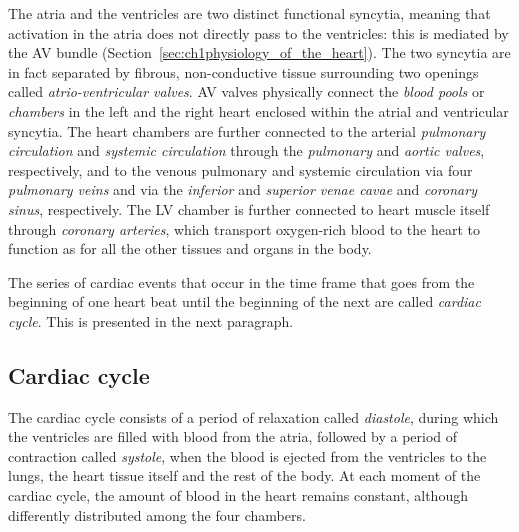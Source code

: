 \vspace{0.2cm}
The atria and the ventricles are two distinct functional syncytia, meaning that activation in the atria does not directly pass to the ventricles: this is mediated by the AV bundle (Section~\ref{sec:ch1physiology_of_the_heart}). The two syncytia are in fact separated by fibrous, non-conductive tissue surrounding two openings called \textit{atrio-ventricular valves}. AV valves physically connect the \textit{blood pools} or \textit{chambers} in the left and the right heart enclosed within the atrial and ventricular syncytia. The heart chambers are further connected to the arterial \textit{pulmonary circulation} and \textit{systemic circulation} through the \textit{pulmonary} and \textit{aortic valves}, respectively, and to the venous pulmonary and systemic circulation via four \textit{pulmonary veins} and via the \textit{inferior} and \textit{superior venae cavae} and \textit{coronary sinus}, respectively. The LV chamber is further connected to heart muscle itself through \textit{coronary arteries}, which transport oxygen-rich blood to the heart to function as for all the other tissues and organs in the body. 

\vspace{0.2cm}
The series of cardiac events that occur in the time frame that goes from the beginning of one heart beat until the beginning of the next are called \textit{cardiac cycle}. This is presented in the next paragraph.


%
%
%
\subsection{Cardiac cycle}\label{sec:ch1cardiac_cycle}
The cardiac cycle consists of a period of relaxation called \textit{diastole}, during which the ventricles are filled with blood from the atria, followed by a period of contraction called \textit{systole}, when the blood is ejected from the ventricles to the lungs, the heart tissue itself and the rest of the body. At each moment of the cardiac cycle, the amount of blood in the heart remains constant, although differently distributed among the four chambers.

